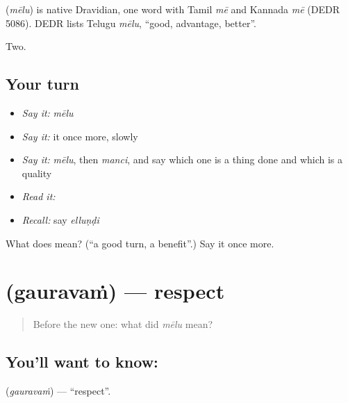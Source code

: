 \begin{cousinweb}
\textbf{} (\emph{mēlu}) is native Dravidian, one word with Tamil \emph{mē} and Kannada \emph{mē} (DEDR 5086). DEDR lists Telugu \emph{mēlu}, \textquotedblleft{}good, advantage, better\textquotedblright{}.
\end{cousinweb}

\begin{grammarlens}[title={What you've built}]
Two.
\end{grammarlens}

\subsection*{Your turn}
\begin{itemize}
\raggedright
  \item \emph{Say it:} \emph{mēlu}
  \item \emph{Say it:} it once more, slowly
  \item \emph{Say it:} \emph{mēlu}, then \emph{manci}, and say which one is a thing done and which is a quality
  \item \emph{Read it:} \textbf{}
  \item \emph{Recall:} say \emph{elluṇḍi}
\end{itemize}

\begin{tcolorbox}[breakable,colback=teal!4,colframe=teal!35!black,title={Before you move on}]
What does  mean? (\textquotedblleft{}a good turn, a benefit\textquotedblright{}.) Say it once more.
\end{tcolorbox}
\section[\texorpdfstring{\te{గౌరవం} (gauravaṁ)}{గౌరవం (gauravaṁ)}]{ (gauravaṁ) — respect}

\label{lesson:TE-C51-respect}



\begin{quote}
Before the new one: what did \emph{mēlu} mean?
\end{quote}

\subsection*{You'll want to know: }
\textbf{} (\emph{gauravaṁ}) — \textquotedblleft{}respect\textquotedblright{}.

